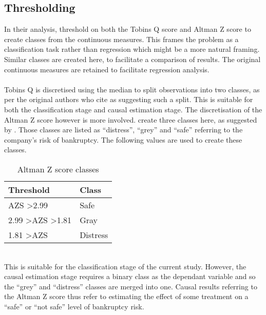 {\subsection{Thresholding}
{In their analysis, \cite{moldovan2015learning} threshold on both the Tobins Q score and Altman Z score to create classes from the continuous measures. This frames the problem as a classification task rather than regression which might be a more natural framing. Similar classes are created here, to facilitate a comparison of results. The original continuous measures are retained to facilitate regression analysis.  \\\\
Tobins Q is discretised using the median to split observations into two classes, as per the original authors who cite \cite{creamer2010learning} as suggesting such a split. This is suitable for both the classification stage and causal estimation stage. The discretisation of the Altman Z score however is more involved. \cite{moldovan2015learning} create three classes here, as suggested by \cite{altman1968financial}. Those classes are listed as ``distress'', ``grey'' and ``safe'' referring to the company's risk of bankruptcy. The following values are used to create these classes. \\
\begin{table}[h!]
\centering
\begin{tabular}{ |p{4cm}|p{3cm}|  }
 \hline
 Threshold & Class \\
 \hline
 AZS \textgreater 2.99 & Safe  \\
 2.99 \textgreater AZS \textgreater 1.81 &   Gray  \\
 1.81 \textgreater AZS  & Distress   \\
 \hline
\end{tabular}
\caption{Altman Z score classes}
\end{table}\\
This is suitable for the classification stage of the current study. However, the causal estimation stage requires a binary class as the dependant variable and so the ``grey'' and ``distress'' classes are merged into one. Causal results referring to the Altman Z score thus refer to estimating the effect of some treatment on a ``safe'' or ``not safe'' level of bankruptcy risk.} 
}
